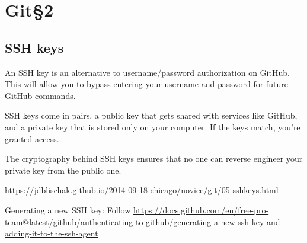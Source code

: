 \section{Git\S 2}

\subsection{SSH keys}

An SSH key is an alternative to username/password authorization on GitHub. This will allow you to bypass entering your username and password for future GitHub commands.


SSH keys come in pairs, a public key that gets shared with services like GitHub, and a private key that is stored only on your computer. If the keys match, you're granted access.

The cryptography behind SSH keys ensures that no one can reverse engineer your private key from the public one.

\url{https://jdblischak.github.io/2014-09-18-chicago/novice/git/05-sshkeys.html}

Generating a new SSH key: Follow \url{https://docs.github.com/en/free-pro-team@latest/github/authenticating-to-github/generating-a-new-ssh-key-and-adding-it-to-the-ssh-agent}



